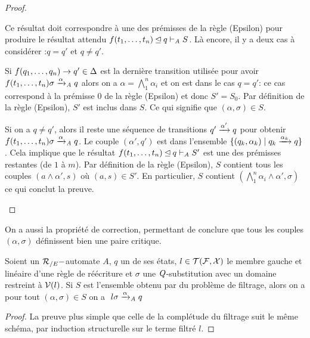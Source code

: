 \begin{proof}
\begin{itemize}
  Ce résultat doit correspondre à une des prémisses de la règle (Epsilon) pour produire le résultat attendu $f(t_1,\dots, t_n) \unlhd q \vdash_\mathit A S$.
  Là encore, il y a deux cas à considérer :$q=q'$ et $q \not = q'$.

  Si $f(q_1,\dots,q_n) \rightarrow q' \in \Delta$ est la dernière transition utilisée pour avoir $f(t_1, \dots, t_n)\sigma \xrightarrow{\alpha}_\mathit A q$ alors
  on a $\alpha = \bigwedge_1^n \alpha_i$ et on est dans le cas $q = q'$: ce cas correspond à la prémisse $0$ de la règle (Epsilon) et donc $S' = S_0$.
  Par définition de la règle (Epsilon), $S'$ est inclus dans $S$. Ce qui signifie que $(\alpha, \sigma) \in S$.

  Si on a $q \not= q'$, alors il reste une séquence de transitions $q' \xrightarrow{\alpha'} q$ pour obtenir $f(t_1, \dots, t_n)\sigma \xrightarrow{\alpha}_\mathit A q$.
  Le couple $(\alpha', q')$ est dans l'ensemble $\{ (q_k, \alpha_k) \; | \; q_k \xrightarrow{\alpha_k} q\}$.%
  Cela implique que le résultat $f(t_1,\dots, t_n) \unlhd q \vdash_\mathit A S'$ est une des prémisses restantes (de $1$ à $m$).
  Par définition de la règle (Epsilon), $S$ contient tous les couples $(a \land \alpha', s)$ où $(a, s) \in S'$. 
  En particulier, $S$ contient $(\bigwedge_1^n \alpha_i \land \alpha', \sigma)$ ce qui conclut la preuve.
\end{itemize}
\end{proof}

On a aussi la propriété de correction, permettant de conclure que tous les couples $(\alpha,\sigma)$ définissent bien une paire critique.
\begin{property}
  \label{prop:matching-correct}
  Soient un ${\mathcal R_{/E}}-$automate $A$, $q$ un de ses états, $l \in \mathcal{T(F, X)}$ le
  membre gauche et linéaire d'une règle de réécriture et $\sigma$ une
  $\mathit Q$-substitution avec un domaine restreint à $\mathcal V(l)$.  Si $S$
  est l'ensemble obtenu par du problème de filtrage, alors on a pour
  tout $(\alpha, \sigma) \in S$ on a $\ l\sigma \xrightarrow{\alpha}_\mathit A q$
\end{property}
\begin{proof}
  La preuve plus simple que celle de la complétude du filtrage suit le même schéma, par induction structurelle 
  sur le terme filtré $l$.
\end{proof}



